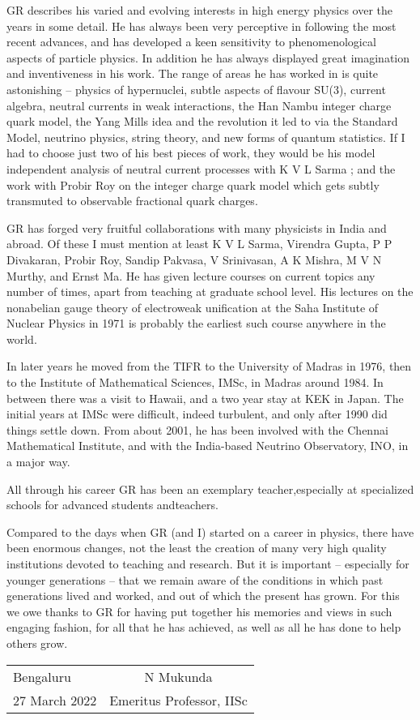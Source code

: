 GR describes his varied and evolving interests in high energy physics 
over the years in some detail. He has always been very perceptive in 
following the most recent advances, and has deve\-loped a keen 
sensitivity to phenomenological aspects of particle physics. In 
addition he has always displayed great imagination and inventiveness in 
his work. The range of areas he has worked in is quite astonishing – 
physics of hypernuclei, subtle aspects of flavour SU(3), current 
algebra, neutral currents in weak interactions, the Han Nambu integer 
charge quark model, the Yang Mills idea and the revolution it led to 
via the Standard Model, neutrino physics, string theory, and new forms 
of quantum statistics. If I had to choose just two of his best pieces 
of work, they would be his model independent analysis of neutral 
current processes with K V L Sarma ; and the work with Probir Roy on 
the integer charge quark model which gets subtly transmuted to 
observable fractional quark charges.
\medskip

GR has forged very fruitful collaborations with many physicists in 
India and abroad. Of these I must mention at least K V L Sarma, 
Virendra Gupta, P P Divakaran, Probir Roy, Sandip Pakvasa, V 
Srinivasan, A K Mishra, M V N Murthy, and Ernst Ma. He has given 
lecture courses on current topics any number of times, apart from 
teaching at graduate school level. His lectures on the nonabelian gauge 
theory of electroweak unification at the Saha Institute of Nuclear 
Physics in 1971 is probably the earliest such course anywhere in the 
world.
\medskip

In later years he moved from the TIFR to the University of Madras in 
1976, then to the Institute of Mathematical Sciences, IMSc, in Madras 
around 1984. In between there was a visit to Hawaii, and a two year 
stay at KEK in Japan. The initial years at IMSc were difficult, indeed 
turbulent, and only after 1990 did things settle down. From about 2001, 
he has been involved with the Chennai Mathematical Institute, and with 
the India-based Neutrino Observatory, INO, in a major way.


All through his career GR has been an exemplary teacher,\break especially at 
specialized schools for advanced students and\break teachers.  


Compared to the days when GR (and I) started on a career in physics, 
there have been enormous changes, not the least the crea\-tion of many 
very high quality institutions devoted to teaching and research. But it 
is important – especially for younger generations – that we remain 
aware of the conditions in which past generations lived and worked, 
and out of which the present has grown. For this we owe thanks to GR 
for having put together his memories and views in such engaging fashion, 
for all that he has achieved, as well as all he has done to help 
others grow.
\vskip 1cm

\begin{flushleft}
\begin{tabular}{l@{\phantom{WWWWWWWWW}}c}
Bengaluru & \quad N Mukunda\\
27 March 2022 & Emeritus Professor, IISc
\end{tabular}
\end{flushleft}
